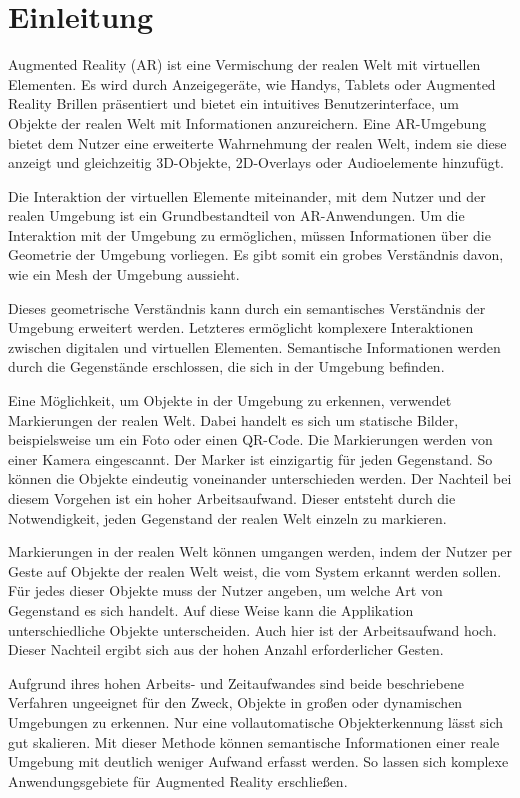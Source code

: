 \section{Einleitung}

Augmented Reality (AR) ist eine Vermischung der realen Welt mit virtuellen Elementen. Es wird durch Anzeigegeräte, wie Handys, Tablets oder Augmented Reality Brillen präsentiert und bietet ein intuitives Benutzerinterface, um Objekte der realen Welt mit Informationen anzureichern. Eine AR-Umgebung bietet dem Nutzer eine erweiterte Wahrnehmung der realen Welt, indem sie diese anzeigt und gleichzeitig 3D-Objekte, 2D-Overlays oder Audioelemente  hinzufügt. 

Die Interaktion der virtuellen Elemente miteinander, mit dem Nutzer und der realen Umgebung ist ein Grundbestandteil von AR-Anwendungen.
Um die Interaktion mit der Umgebung zu ermöglichen, müssen Informationen über die Geometrie der Umgebung vorliegen. Es gibt somit ein grobes Verständnis davon, wie ein Mesh der Umgebung aussieht. 

Dieses geometrische Verständnis kann durch ein semantisches Verständnis der Umgebung erweitert werden. Letzteres ermöglicht komplexere Interaktionen zwischen digitalen und virtuellen Elementen. Semantische Informationen werden durch die Gegenstände erschlossen, die sich in der Umgebung befinden. 

Eine Möglichkeit, um Objekte in der Umgebung zu erkennen, verwendet Markierungen der realen Welt. Dabei handelt es sich um statische Bilder, beispielsweise um ein Foto oder einen QR-Code. Die Markierungen werden von einer Kamera eingescannt. Der Marker ist einzigartig für jeden Gegenstand. So können die Objekte eindeutig voneinander unterschieden werden. Der Nachteil bei diesem Vorgehen ist ein hoher Arbeitsaufwand. Dieser entsteht durch die Notwendigkeit, jeden Gegenstand der realen Welt einzeln zu markieren.

Markierungen in der realen Welt können umgangen werden, indem der Nutzer per Geste auf Objekte der realen Welt weist, die vom System erkannt werden sollen. Für jedes dieser Objekte muss der Nutzer angeben, um welche Art von Gegenstand es sich handelt. Auf diese Weise kann die Applikation unterschiedliche Objekte unterscheiden. Auch hier ist der Arbeitsaufwand hoch. Dieser Nachteil ergibt sich aus der hohen Anzahl erforderlicher Gesten.

Aufgrund ihres hohen Arbeits- und Zeitaufwandes sind beide beschriebene Verfahren ungeeignet für den Zweck, Objekte in großen oder dynamischen Umgebungen zu erkennen. Nur eine vollautomatische Objekterkennung lässt sich gut skalieren. Mit dieser Methode können semantische Informationen einer reale Umgebung mit deutlich weniger Aufwand erfasst werden. So lassen sich komplexe Anwendungsgebiete für Augmented Reality erschließen.

